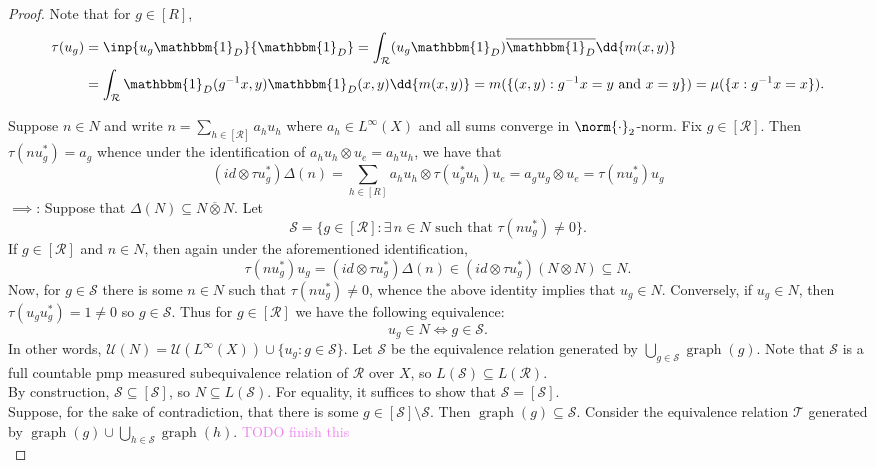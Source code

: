 \documentclass[12pt,letterpaper]{article}
\newcommand{\sub}{\subseteq}
\DeclareMathOperator{\graph}{graph}
\newcommand*\cls[1]{\overline{#1}}
\newcommand{\ind}{\mathbbm{1}}
\theoremstyle{definition}
\theoremstyle{plain}
\theoremstyle{remark}
\begin{document}
\begin{proof}
    Note that for $ g\in [R] $,
    \begin{align*}
        \tau(u_{g}) &= \inp{u_{g}\ind_{D}}{\ind_{D}} = \int_{\mathcal{R}} (u_{g}\ind_{D})\cls{\ind_{D}} \dd{m(x,y)}\\
        &=\int_{\mathcal{R}} \ind_{D}(g^{-1}x,y)\ind_{D}(x,y) \dd{m(x,y)} = m(\{(x,y):g^{-1}x = y \text{ and } x = y\}) = \mu(\{x: g^{-1}x = x\}).
    \end{align*}

    Suppose $ n\in N $ and write $ n = \sum_{h\in[\mathcal{R}]}a_{h}u_{h} $ where $ a_{h}\in L^{\infty}(X) $ and all sums converge in $ \norm{\cdot}_{2} $-norm. Fix $ g\in [\mathcal{R}] $. Then $ \tau(nu_{g}^{*}) = a_{g} $ whence under the identification of $ a_{h}u_{h}\otimes u_{e} = a_{h}u_{h} $, we have that
    \[
        (id \otimes \tau u_{g}^{*}) \Delta(n) = \sum_{h\in [R]}a_{h}u_{h} \otimes \tau(u_{g}^{*}u_{h})u_{e} = a_{g}u_{g} \otimes u_{e} = \tau(nu_{g}^{*})u_{g}
    \]
    \underline{$ \implies $}: Suppose that $ \Delta(N)\sub N \cls{\otimes} N $. Let 
    \[
        \mathscr{S} = \{g\in [\mathcal{R}]: \exists\, n\in N \text{ such that } \tau(nu_{g}^{*}) \neq 0\}.
    \]
    If $ g\in [\mathcal{R}] $ and $ n\in N $, then again under the aforementioned identification,
    \[
       \tau(nu_{g}^{*} )u_{g} = (id \otimes \tau u_{g}^{*}) \Delta(n) \in (id \otimes \tau u_{g}^{*})(N \otimes N) \sub N.
    \]
    Now, for $ g\in \mathscr{S} $ there is some $ n\in N $ such that $ \tau(nu_{g}^{*})\neq 0 $, whence the above identity implies that $ u_{g}\in N $. Conversely, if $ u_{g}\in N $, then $ \tau(u_{g}u_{g}^{*}) = 1 \neq 0 $ so $ g\in \mathscr{S} $. Thus for $ g\in[\mathcal{R}] $ we have the following equivalence:
    \[
        u_{g}\in N \iff g\in \mathscr{S}.
    \]
    In other words, $ \mathcal{U}(N) = \mathcal{U}(L^{\infty}(X))\cup \{u_{g}: g\in \mathscr{S}\} $.
    Let $ \mathcal{S} $ be the equivalence relation generated by $ \bigcup_{g\in \mathscr{S}} \graph(g) $. Note that $ \mathcal{S} $ is a full countable pmp measured subequivalence relation of $ \mathcal{R} $ over $ X $, so $ L(\mathcal{S})\sub L(\mathcal{R}) $.\\

    By construction, $ \mathscr{S} \sub [\mathcal{S}] $, so $ N\sub L(\mathcal{S}) $. For equality, it suffices to show that $ \mathscr{S} = [\mathcal{S}] $. \\

    Suppose, for the sake of contradiction, that there is some $ g\in [\mathcal{S}]\setminus \mathscr{S} $. Then $ \graph(g)\sub \mathcal{S} $. Consider the equivalence relation $ \mathcal{T} $ generated by $ \graph(g)\cup\bigcup_{h\in \mathscr{S}}\graph(h) $. \textcolor{violet}{TODO finish this}\\



\end{proof}
\end{document}
